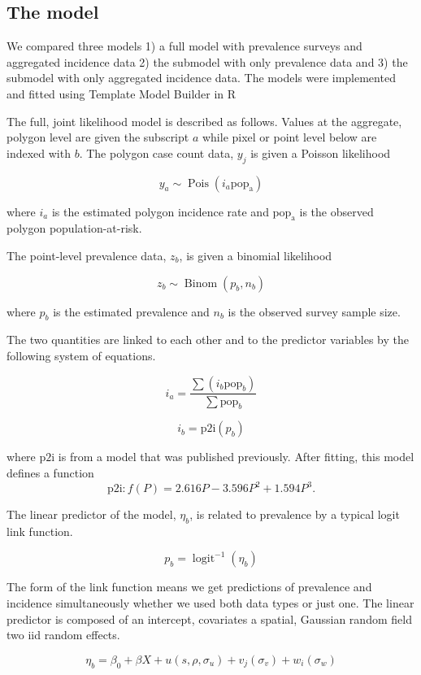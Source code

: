 \documentclass[10pt,letterpaper]{article}
\begin{document}
\subsection*{The model}

We compared three models 1) a full model with prevalence surveys and aggregated incidence data 2) the submodel with only prevalence data and 3) the submodel with only aggregated incidence data. 
The models were implemented and fitted using Template Model Builder \cite{TMB} in R \cite{R}

The full, joint likelihood model is described as follows. 
Values at the aggregate, polygon level are given the subscript $a$ while pixel or point level below are indexed with $b$.
The polygon case count data, $y_j$ is given a Poisson likelihood

$$y_a \sim \operatorname{Pois}(i_a\mathrm{pop_a})$$

where $i_a$ is the estimated polygon incidence rate and $\mathrm{pop_a}$ is the observed polygon population-at-risk.

The point-level prevalence data, $z_b$, is given a binomial likelihood

$$z_b \sim \operatorname{Binom}(p_b, n_b) $$

where $p_b$ is the estimated prevalence and $n_b$ is the observed survey sample size. 

The two quantities are linked to each other and to the predictor variables by the following system of equations.

$$i_a = \frac{ \sum(i_b \mathrm{pop}_b)}{\sum  \mathrm{pop}_b} $$

$$i_b = \mathrm{p2i}(p_b)$$

where $\mathrm{p2i}$ is from a model that was published previously. \cite{cameron2015defining}
After fitting, this model defines a function
$$\mathrm{p2i}: f\left(P\right) = 2.616P - 3.596P^2 + 1.594P^3.$$

The linear predictor of the model, $\eta_b$, is related to prevalence by a typical logit link function.

$$p_b = \operatorname{logit}^{-1}(\eta_b)$$


The form of the link function means we get predictions of prevalence and incidence simultaneously whether we used both data types or just one.
The linear predictor is composed of an intercept, covariates a spatial, Gaussian random field two iid random effects.

$$\eta_b = \beta_0 + \beta X  + u(s, \rho, \sigma_u) + v_j(\sigma_v) + w_i(\sigma_w)$$
\end{document}
